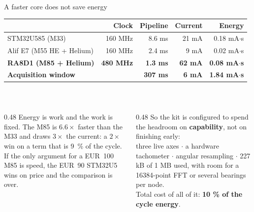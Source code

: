 \documentclass[aspectratio=169,10pt]{beamer}
\begin{document}
\begin{frame}{A faster core does not save energy}
  \centering
  \scriptsize
  \begin{tabular}{@{}lrrrr@{}}
    \toprule
    & \textbf{Clock} & \textbf{Pipeline} & \textbf{Current} & \textbf{Energy} \\
    \midrule
    STM32U585 (M33)            & 160 MHz & 8.6 ms & 21 mA & 0.18 mA$\cdot$s \\
    Alif E7 (M55 HE + Helium)  & 160 MHz & 2.4 ms & 9 mA  & 0.02 mA$\cdot$s \\
    \textbf{RA8D1 (M85 + Helium)} & \textbf{480 MHz} & \textbf{1.3 ms} &
      \textbf{62 mA} & \textbf{0.08 mA$\cdot$s} \\
    \midrule
    \textcolor{pdmcrit}{\textbf{Acquisition window}} & &
      \textcolor{pdmcrit}{\textbf{307 ms}} & \textcolor{pdmcrit}{\textbf{6 mA}} &
      \textcolor{pdmcrit}{\textbf{1.84 mA$\cdot$s}} \\
    \bottomrule
  \end{tabular}
  \\[3mm]
  \begin{columns}[T]
    \begin{column}{0.48\textwidth}
      \scriptsize
      Energy is work and the work is fixed. The M85 is $6.6\times$ faster than
      the M33 and draws $3\times$ the current: a $2\times$ win on a term that
      is 9~\% of the cycle.
      \\[2mm]
      If the only argument for a EUR~100 M85 is speed, the EUR~90 STM32U5
      wins on price and the comparison is over.
    \end{column}
    \begin{column}{0.48\textwidth}
      \scriptsize\color{pdmink2}
      So the kit is configured to spend the headroom on \textbf{capability},
      not on finishing early:
      \\[1mm]
      three live axes $\cdot$ a hardware tachometer $\cdot$ angular resampling
      $\cdot$ 227 kB of 1 MB used, with room for a 16384-point FFT or several
      bearings per node.
      \\[2mm]
      Total cost of all of it: \textbf{10 \% of the cycle energy}.
    \end{column}
  \end{columns}
\end{frame}
\end{document}
